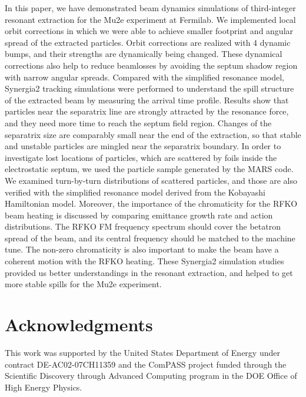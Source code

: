 \documentclass[aps,prstab,onecolumn,preprint]{revtex4-1}
\begin{document}
In this paper, we have demonstrated beam dynamics simulations of third-integer resonant extraction for the Mu2e experiment at Fermilab. We implemented local orbit corrections in which we were able to achieve smaller footprint and angular spread of the extracted particles. Orbit corrections are realized with 4 dynamic bumps, and their strengths are dynamically being changed. These dynamical corrections also help to reduce beamlosses by avoiding the septum shadow region with narrow angular spreads. Compared with the simplified resonance model, Synergia2 tracking simulations were performed to understand the spill structure of the extracted beam by measuring the arrival time profile. Results show that particles near the separatrix line are strongly attracted by the resonance force, and they need more time to reach the septum field region. Changes of the separatrix size are comparably small near the end of the extraction, so that stable and unstable particles are mingled near the separatrix boundary. In order to investigate lost locations of particles, which are scattered by foils inside the electrostatic septum, we used the particle sample generated by the MARS code. We examined turn-by-turn distributions of scattered particles, and those are also verified with the simplified resonance model derived from the Kobayashi Hamiltonian model. Moreover, the importance of the chromaticity for the RFKO beam heating is discussed by comparing emittance growth rate and action distributions. The RFKO FM frequency spectrum should cover the betatron spread of the beam, and its central frequency should be matched to the machine tune. The non-zero chromaticity is also important to make the beam have a coherent motion with the RFKO heating. These Synergia2 simulation studies provided us better understandings in the resonant extraction, and helped to get more stable spills for the Mu2e experiment.



\section{\label{thanks}Acknowledgments}

This work was supported by the United States Department of Energy under contract DE-AC02-07CH11359 and the ComPASS project funded through the Scientific Discovery through Advanced Computing program in the DOE Office of High Energy Physics.
\end{document}
